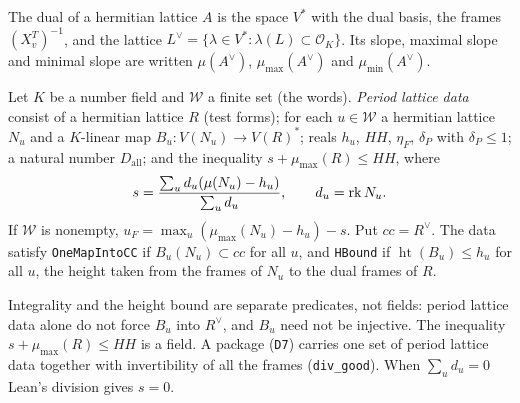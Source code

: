 \begin{definition}[duals]\label{geoa:dual}
The dual of a hermitian lattice $A$ is the space $V^*$ with the dual basis, the frames
$(X_v^{T})^{-1}$, and the lattice $L^{\vee}=\{\lambda\in V^*:\lambda(L)\subset\mathcal O_K\}$.
Its slope, maximal slope and minimal slope are written $\mu(A^{\vee})$,
$\mu_{\max}(A^{\vee})$ and $\mu_{\min}(A^{\vee})$.
\end{definition}

\begin{definition}\label{geoa:divdata}
Let $K$ be a number field and $\mathcal W$ a finite set (the words). \emph{Period
lattice data} consist of a hermitian lattice $R$ (test forms); for each $u\in\mathcal W$
a hermitian lattice $N_u$ and a $K$-linear map $B_u\colon V(N_u)\to V(R)^*$; reals
$h_u$, $HH$, $\eta_F$, $\delta_P$ with $\delta_P\le1$; a natural number $D_{\mathrm{all}}$;
and the inequality $s+\mu_{\max}(R)\le HH$, where
\[
s=\frac{\sum_u d_u(\mu(N_u)-h_u)}{\sum_ud_u},\qquad d_u=\operatorname{rk} N_u .
\]
If $\mathcal W$ is nonempty, $u_F=\max_u(\mu_{\max}(N_u)-h_u)-s$. Put $cc=R^{\vee}$. The
data satisfy \texttt{OneMapIntoCC} if $B_u(N_u)\subset cc$ for all $u$, and
\texttt{HBound} if $\operatorname{ht}(B_u)\le h_u$ for all $u$, the height taken from
the frames of $N_u$ to the dual frames of $R$.
\end{definition}

\begin{remark}\label{geoa:rem-divdata}
Integrality and the height bound are separate predicates, not fields: period lattice
data alone do not force $B_u$ into $R^{\vee}$, and $B_u$ need not be injective. The
inequality $s+\mu_{\max}(R)\le HH$ is a field. A package (\texttt{D7}) carries one set of
period lattice data together with invertibility of all the frames
(\texttt{div\_good}). When $\sum_ud_u=0$ Lean's division gives $s=0$.
\end{remark}

